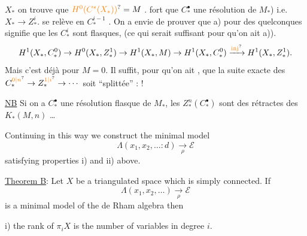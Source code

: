  $X_*$  on trouve que   $\unsure{H^0(C^*(X_*))}=M$ .   fort que $C_*^\bullet$  une résolution de $M_*$) i.e.  $X_*\to Z_*^i$.
se relève en $C_*^{i-1}$ \unsure{--}. On a envie de prouver que a) pour des quelconques signifie que les $C_*^i$ sont flasques, (ce qui serait  suffisant pour qu'on ait a)).
\[
 H^1(X_*,C_*^0)\to H^0(X_*,Z_*^1)\to H^1(X_*,M)\to H^1(X_*,C_*^0)\xrightarrow{\unsure{\text{inj}}} H^1(X_*,Z_*^1).
\]
Mais c'est  déjà pour $M=0$. Il suffit, pour qu'on ait , que la suite exacte  des $C_*^{\unsure{0|n}}\to Z_*^{\unsure{1|i}}\to\cdots$ soit ``splittée''  :  !

\uline{NB} Si on a $C_*^\bullet$ une résolution flasque de $M_*$, les $Z_*^n(C_*^\bullet)$ sont des rétractes des $K_*(M,n)$ \ldots

Continuing in this way we construct the minimal model
\[
 \Lambda(x_1,x_2,\ldots\mathbin{:}d)\underset{\rho}{\to}\mathcal{E}
\]
satisfying properties i) and ii) above.

\uline{Theorem B}: Let $X$ be a triangulated space which is simply connected. If
\[
 \Lambda(x_1,x_2,\ldots)\underset{\rho}{\to}\mathcal{E}
\]
is a minimal model of the de Rham algebra then

i) the rank of $\pi_i X$ is the number of variables in degree $i$.

